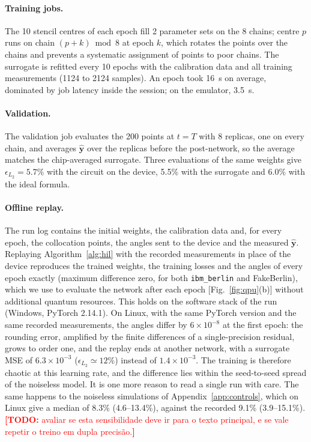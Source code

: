\documentclass[floatfix,aps,pra,twocolumn,superscriptaddress,10pt,nofootinbib]{revtex4-2}
\newif\ifshowtodos \showtodostrue
\newcommand{\TODO}[1]{\ifshowtodos\textcolor{red}{\textbf{[TODO:} #1\textbf{]}}\fi}
\begin{document}
\begin{appendices}
\paragraph{Training jobs.} The 10 stencil centres of each epoch fill 2 parameter sets on the 8 chains; centre $p$ runs on chain $(p+k)\bmod8$ at epoch $k$, which rotates the points over the chains and prevents a systematic assignment of points to poor chains. The surrogate is refitted every 10 epochs with the calibration data and all training measurements (1124 to 2124 samples). An epoch took 16~s on average, dominated by job latency inside the session; on the emulator, 3.5~s.

\paragraph{Validation.} The validation job evaluates the 200 points at $t=T$ with 8 replicas, one on every chain, and averages $\hat{\bm y}$ over the replicas before the post-network, so the average matches the chip-averaged surrogate. Three evaluations of the same weights give $\epsilon_{L_2}=5.7\%$ with the circuit on the device, 5.5\% with the surrogate and 6.0\% with the ideal formula.

\paragraph{Offline replay.} The run log contains the initial weights, the calibration data and, for every epoch, the collocation points, the angles sent to the device and the measured $\hat{\bm y}$. Replaying Algorithm~\ref{alg:hil} with the recorded measurements in place of the device reproduces the trained weights, the training losses and the angles of every epoch exactly (maximum difference zero, for both \texttt{ibm\_berlin} and FakeBerlin), which we use to evaluate the network after each epoch [Fig.~\ref{fig:qpu}(b)] without additional quantum resources. This holds on the software stack of the run (Windows, PyTorch 2.14.1). On Linux, with the same PyTorch version and the same recorded measurements, the angles differ by $6\times10^{-8}$ at the first epoch: the rounding error, amplified by the finite differences of a single-precision residual, grows to order one, and the replay ends at another network, with a surrogate MSE of $6.3\times10^{-3}$ ($\epsilon_{L_2}\simeq12\%$) instead of $1.4\times10^{-3}$. The training is therefore chaotic at this learning rate, and the difference lies within the seed-to-seed spread of the noiseless model. It is one more reason to read a single run with care. The same happens to the noiseless simulations of Appendix~\ref{app:controls}, which on Linux give a median of 8.3\% (4.6--13.4\%), against the recorded 9.1\% (3.9--15.1\%). \TODO{avaliar se esta sensibilidade deve ir para o texto principal, e se vale repetir o treino em dupla precis\~ao.}


\end{appendices}
\end{document}
